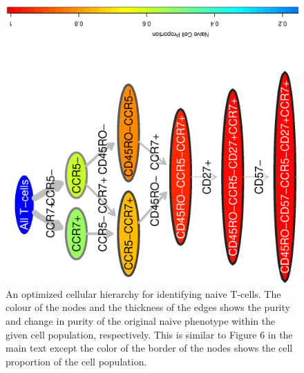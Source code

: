   \begin{figure}[!ht]
    \begin{center}
      \includegraphics[width=\textwidth, angle=270]{figs/rchy/figs/PropNaiveOverlap}
    \end{center}
    \caption{An optimized cellular hierarchy for identifying naive T-cells. The colour of the nodes and the thickness of the edges shows the purity and change in purity of the original naive phenotype within the given cell population, respectively.
      This is similar to Figure 6 in the main text except the color of the border of the nodes shows the cell proportion of the cell population.
    }
    \label{r1:NaiveOverlapProp}
  \end{figure}

